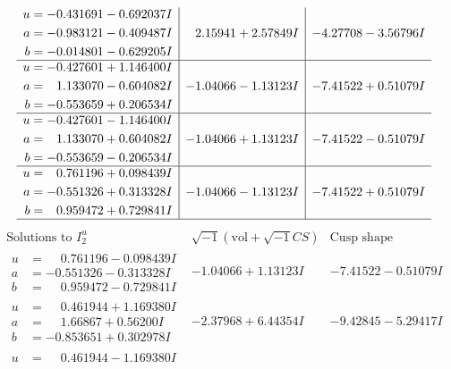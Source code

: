 \documentclass[1p]{elsarticle_modified}
\theoremstyle{definition}
\newcommand{\I}{\sqrt{-1}}
\begin{document}
$$\begin{array}{c|c|c}
\begin{aligned}
u &= -0.431691 - 0.692037 I \\
a &= -0.983121 - 0.409487 I \\
b &= -0.014801 - 0.629205 I\end{aligned}
 & \phantom{-}2.15941 + 2.57849 I & -4.27708 - 3.56796 I \\ \hline\begin{aligned}
u &= -0.427601 + 1.146400 I \\
a &= \phantom{-}1.133070 - 0.604082 I \\
b &= -0.553659 + 0.206534 I\end{aligned}
 & -1.04066 - 1.13123 I & -7.41522 + 0.51079 I \\ \hline\begin{aligned}
u &= -0.427601 - 1.146400 I \\
a &= \phantom{-}1.133070 + 0.604082 I \\
b &= -0.553659 - 0.206534 I\end{aligned}
 & -1.04066 + 1.13123 I & -7.41522 - 0.51079 I \\ \hline\begin{aligned}
u &= \phantom{-}0.761196 + 0.098439 I \\
a &= -0.551326 + 0.313328 I \\
b &= \phantom{-}0.959472 + 0.729841 I\end{aligned}
 & -1.04066 - 1.13123 I & -7.41522 + 0.51079 I\\
 \hline 
 \end{array}$$\newpage$$\begin{array}{c|c|c}  
\text{Solutions to }I^u_{2}& \I (\text{vol} + \sqrt{-1}CS) & \text{Cusp shape}\\
 \hline 
\begin{aligned}
u &= \phantom{-}0.761196 - 0.098439 I \\
a &= -0.551326 - 0.313328 I \\
b &= \phantom{-}0.959472 - 0.729841 I\end{aligned}
 & -1.04066 + 1.13123 I & -7.41522 - 0.51079 I \\ \hline\begin{aligned}
u &= \phantom{-}0.461944 + 1.169380 I \\
a &= \phantom{-}1.66867 + 0.56200 I \\
b &= -0.853651 + 0.302978 I\end{aligned}
 & -2.37968 + 6.44354 I & -9.42845 - 5.29417 I \\ \hline\begin{aligned}
u &= \phantom{-}0.461944 - 1.169380 I \\

\end{aligned}
\end{array}$$
\end{document}
